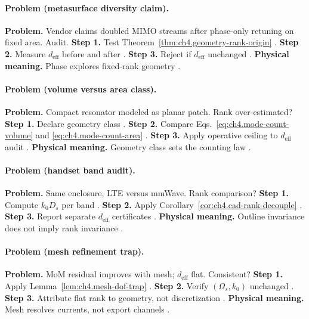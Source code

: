 \paragraph{Problem (metasurface diversity claim).}
\textbf{Problem.} Vendor claims doubled MIMO streams after phase-only retuning on fixed area. Audit.
\textbf{Step 1.} Test Theorem~\ref{thm:ch4.geometry-rank-origin} \cite{stratton1941,harrington2001}.
\textbf{Step 2.} Measure \(d_{\mathrm{eff}}\) before and after \cite{hansen1988,devaney2004}.
\textbf{Step 3.} Reject if \(d_{\mathrm{eff}}\) unchanged \cite{jackson1999}.
\textbf{Physical meaning.} Phase explores fixed-rank geometry \cite{harrington2001}.

\paragraph{Problem (volume versus area class).}
\textbf{Problem.} Compact resonator modeled as planar patch. Rank over-estimated?
\textbf{Step 1.} Declare geometry class \cite{collin2001,stratton1941}.
\textbf{Step 2.} Compare Eqs.~\eqref{eq:ch4.mode-count-volume} and \eqref{eq:ch4.mode-count-area} \cite{jackson1999,hansen1988}.
\textbf{Step 3.} Apply operative ceiling to \(d_{\mathrm{eff}}\) audit \cite{harrington2001,devaney2004}.
\textbf{Physical meaning.} Geometry class sets the counting law \cite{stratton1941}.

\paragraph{Problem (handset band audit).}
\textbf{Problem.} Same enclosure, LTE versus mmWave. Rank comparison?
\textbf{Step 1.} Compute \(k_{0}D_{s}\) per band \cite{jackson1999,harrington2001}.
\textbf{Step 2.} Apply Corollary~\ref{cor:ch4.cad-rank-decouple} \cite{hansen1988}.
\textbf{Step 3.} Report separate \(d_{\mathrm{eff}}\) certificates \cite{devaney2004,collin2001}.
\textbf{Physical meaning.} Outline invariance does not imply rank invariance \cite{stratton1941}.

\paragraph{Problem (mesh refinement trap).}
\textbf{Problem.} MoM residual improves with mesh; \(d_{\mathrm{eff}}\) flat. Consistent?
\textbf{Step 1.} Apply Lemma~\ref{lem:ch4.mesh-dof-trap} \cite{harrington2001,devaney2004}.
\textbf{Step 2.} Verify \((\Omega_{s},k_{0})\) unchanged \cite{stratton1941,hansen1988}.
\textbf{Step 3.} Attribute flat rank to geometry, not discretization \cite{jackson1999}.
\textbf{Physical meaning.} Mesh resolves currents, not export channels \cite{harrington2001}.

